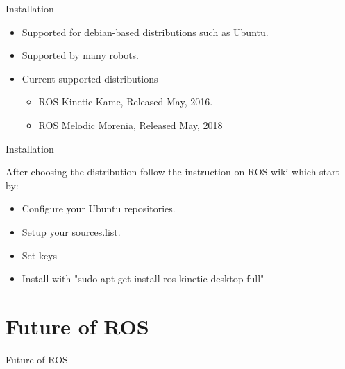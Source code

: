 \documentclass{beamer}
\begin{document}



\begin{frame}{Installation}

\begin{itemize}
\item Supported for debian-based distributions such as Ubuntu.
\item Supported by many robots.
\item Current supported distributions
\begin{itemize}
\item ROS Kinetic Kame, Released May, 2016.
\item ROS Melodic Morenia, Released May, 2018
\end{itemize}
\end{itemize}

\end{frame}
\begin{frame}{Installation}

After choosing the distribution follow the instruction on ROS wiki which start by:
\begin{itemize}
\item Configure your Ubuntu repositories.
\item Setup your sources.list.
\item Set keys
\item Install with "sudo apt-get install ros-kinetic-desktop-full"
\end{itemize}

\end{frame}


\section{Future of ROS}


\begin{frame}{Future of ROS}
  
\end{frame}
\end{document}
